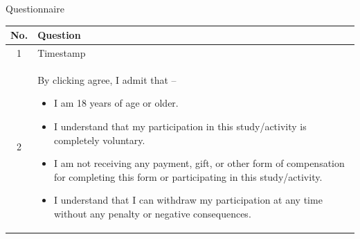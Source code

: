 \documentclass[12pt,a4paper]{article}
\begin{document}
\begin{center}
    {\LARGE Questionnaire}
\end{center}

\vspace{1cm}

\begin{longtable}{|c|p{12cm}|}
\hline
\textbf{No.} & \textbf{Question} \\
\hline

1 & Timestamp \\ \hline

2 & By clicking agree, I admit that --
\begin{itemize}
    \item I am 18 years of age or older.
    \item I understand that my participation in this study/activity is completely voluntary.
    \item I am not receiving any payment, gift, or other form of compensation for completing this form or participating in this study/activity.
    \item I understand that I can withdraw my participation at any time without any penalty or negative consequences.
\end{itemize}
\\ \hline


\end{longtable}
\end{document}
